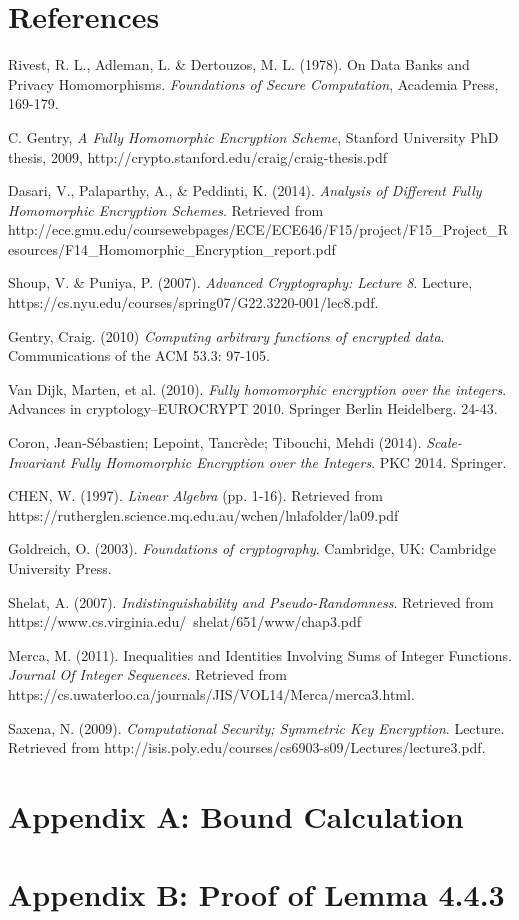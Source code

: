 \documentclass{article}
\begin{document}
\section{References}

\begin{thebibliography}{9}


 Rivest, R. L., Adleman, L. \& Dertouzos, M. L. (1978). On Data Banks and Privacy Homomorphisms. \textit{Foundations of Secure Computation}, Academia Press, 169-179. 

 C. Gentry, \textit{A Fully Homomorphic Encryption Scheme}, Stanford University PhD thesis, 2009,
http://crypto.stanford.edu/craig/craig-thesis.pdf

 Dasari, V., Palaparthy, A., \& Peddinti, K. (2014). \textit{Analysis of Different Fully Homomorphic Encryption Schemes}. Retrieved from http://ece.gmu.edu/coursewebpages/ECE/ECE646/F15/project/F15\allowbreak \_Project\_Resources/F14\_Homomorphic\_Encryption\_report.pdf

 Shoup, V. \& Puniya, P. (2007). \textit{Advanced Cryptography: Lecture 8}. Lecture, https://cs.nyu.edu/courses/spring07/G22.3220-001/lec8.pdf.

 Gentry, Craig. (2010) \textit{Computing arbitrary functions of encrypted data}. Communications of the ACM 53.3: 97-105.

 Van Dijk, Marten, et al. (2010). \textit{Fully homomorphic encryption over the integers}. Advances in cryptology–EUROCRYPT 2010. Springer Berlin Heidelberg. 24-43.

 Coron, Jean-Sébastien; Lepoint, Tancrède; Tibouchi, Mehdi (2014). \textit{Scale-Invariant Fully Homomorphic Encryption over the Integers}. PKC 2014. Springer.

 CHEN, W. (1997). \textit{Linear Algebra} (pp. 1-16). Retrieved from https://rutherglen.science.mq.edu.au/wchen/lnlafolder/la09.pdf

 Goldreich, O. (2003). \textit{Foundations of cryptography}. Cambridge, UK: Cambridge University Press.

 Shelat, A. (2007). \textit{Indistinguishability and Pseudo-Randomness}. Retrieved from https://www.cs.virginia.edu/~shelat/651/www/chap3.pdf

 Merca, M. (2011). Inequalities and Identities Involving Sums of Integer Functions. \textit{Journal Of Integer Sequences}. Retrieved from https://cs.uwaterloo.ca/journals/JIS/VOL14/Merca/merca3.html.

 Saxena, N. (2009). \textit{Computational Security; Symmetric Key Encryption}. Lecture. Retrieved from http://isis.poly.edu/courses/cs6903-s09/Lectures/lecture3.pdf.

\end{thebibliography}
\newpage

\section{Appendix A: Bound Calculation}


\section{Appendix B: Proof of Lemma 4.4.3}

\end{document}
